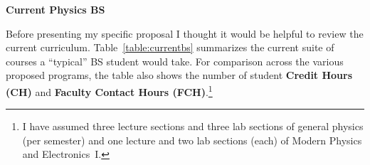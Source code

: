 \documentclass[12pt,preprint]{aastex}
\begin{document}


\vspace{2mm}
{\large \sc \textbf{Current Physics BS}}

Before presenting my specific proposal I thought it would be helpful to review
the current curriculum.  Table~\ref{table:currentbs} summarizes the current
suite of courses a ``typical'' BS student would take.  For comparison across the
various proposed programs, the table also shows the number of student {\bf
  Credit Hours (CH)} and {\bf Faculty Contact Hours (FCH)}.\footnote{I have
  assumed three lecture sections and three lab sections of general physics (per
  semester) and one lecture and two lab sections (each) of Modern Physics and
  Electronics~I.}
\end{document}
